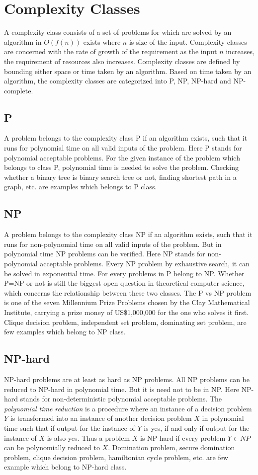 \section{Complexity Classes}
\noindent
A complexity class consists of a set of problems for which are solved by an algorithm in $O(f(n))$ exists where $n$ is size of the input. Complexity classes are concerned with the rate of growth of the requirement as the input $n$ increases, the requirement of resources also increases. Complexity classes are defined by bounding either space or time taken by an algorithm. Based on time taken by an algorithm, the complexity classes are categorized into P, NP, NP-hard and NP-complete. 
\subsection{P}
\noindent
A problem belongs to the complexity class P if an algorithm exists, such that it runs for polynomial time on all valid inputs of the problem. Here P stands for polynomial acceptable problems. For the given instance of the problem which belongs to class P, polynomial time is needed to solve the problem. Checking whether a binary tree is  binary search tree or not, finding shortest path in a graph, etc. are examples which belongs to P class.
\subsection{NP}
\noindent
A problem belongs to the complexity class NP if an algorithm exists, such that it runs for non-polynomial time on all valid inputs of the problem. But in polynomial time NP problems can be verified. Here NP stands for non-polynomial acceptable problems. Every NP problem by exhaustive search, it can be solved in exponential time. For every problems in P belong to NP. Whether P=NP or not is still the biggest open question in theoretical computer science, which concerns the relationship between these two classes. The P vs NP problem is one of the seven Millennium Prize Problems chosen by the Clay Mathematical Institute, carrying a prize money of US\$1,000,000 for the one who solves it first. Clique decision problem, independent set problem, dominating set problem, are few examples which belong to NP class.
\subsection{NP-hard}
\noindent
NP-hard problems are at least as hard as NP problems. All NP problems can be reduced to NP-hard in polynomial time. But it is need not to be in NP. Here NP-hard stands for non-deterministic polynomial acceptable problems. The \textit{polynomial time reduction} is a procedure where an instance of a decision problem $Y$ is transformed into an instance of another decision problem $X$ in polynomial time such that if output for the instance of $Y$ is yes, if and only if output for the instance of $X$ is also yes. Thus a problem $X$ is NP-hard if every problem $Y\in NP$ can be polynomially reduced to $X$. Domination problem, secure domination problem, clique decision problem, hamiltonian cycle problem, etc. are few example which belong to NP-hard class.

